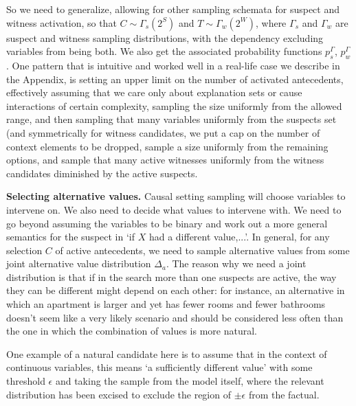 \documentclass[anon,12pt]{clear2025} %
\begin{document}
So we need to generalize, allowing for other sampling schemata for suspect and witness activation, so that $C \sim \Gamma_s(2^S)$ and $T \sim \Gamma_w(2^W)$, where $\Gamma_s$ and $\Gamma_w$ are suspect and witness sampling distributions, with the dependency excluding variables from being both. We also get the associated probability functions $p^\Gamma_s$, $p^\Gamma_w$. One pattern that is intuitive and worked well in a real-life case we describe in the Appendix, is setting an upper limit on the number of activated antecedents, effectively assuming that we care only about explanation sets or cause interactions of certain complexity, sampling the size uniformly from the allowed range, and then sampling that many variables uniformly from the suspects set (and symmetrically for witness candidates, we put a cap on the number of context elements to be dropped, sample a size uniformly from the remaining options, and sample that many active witnesses uniformly from the witness candidates diminished by the active suspects.

\vspace{2mm}
\noindent \textbf{Selecting alternative values.} Causal setting sampling will choose variables to intervene on. We also need to decide what values to intervene with.
We need to go beyond assuming the variables to be binary and work out a more general semantics for the suspect in `if $X$ had a different value,...'. In general, for any selection $C$ of active antecedents, we need to sample alternative values from some joint alternative value distribution $\Delta_a$. The reason why we need a joint distribution is that if in the search more than one suspects are active, the way they can be different might depend on each other: for instance, an alternative in which an apartment is larger and yet has fewer rooms and fewer bathrooms doesn't seem like a very likely scenario and should be considered less often than the one in which the combination of values is more natural.


One example of a natural candidate here is to assume that in the context of continuous variables, this means `a sufficiently different value' with some threshold $\epsilon$ and taking the sample from the model itself, where the relevant distribution has been excised to exclude the region of $\pm \epsilon$ from the factual. 
\end{document}
